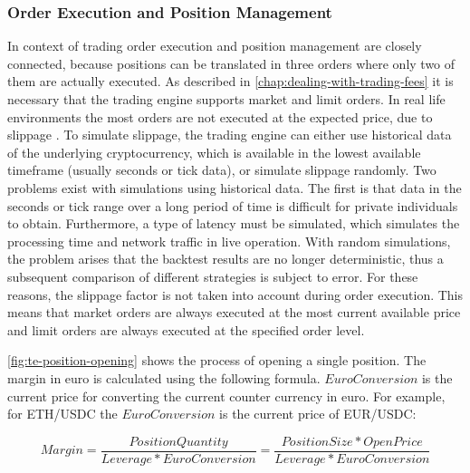 \subsubsection{Order Execution and Position Management}

In context of trading order execution and position management are closely connected, because positions can be translated in three orders where only two of them are actually executed.
As described in \autoref{chap:dealing-with-trading-fees} it is necessary that the trading engine supports market and limit orders.
In real life environments the most orders are not executed at the expected price, due to slippage \cite{ig-slippage}.
To simulate slippage, the trading engine can either use historical data of the underlying cryptocurrency, which is available in the lowest available timeframe (usually seconds or tick data), or simulate slippage randomly.
Two problems exist with simulations using historical data.
The first is that data in the seconds or tick range over a long period of time is difficult for private individuals to obtain.
Furthermore, a type of latency must be simulated, which simulates the processing time and network traffic in live operation.
With random simulations, the problem arises that the backtest results are no longer deterministic, thus a subsequent comparison of different strategies is subject to error.
For these reasons, the slippage factor is not taken into account during order execution.
This means that market orders are always executed at the most current available price and limit orders are always executed at the specified order level.


\autoref{fig:te-position-opening} shows the process of opening a single position.
The margin in euro is calculated using the following formula.
$EuroConversion$ is the current price for converting the current counter currency in euro.
For example, for ETH/USDC the $EuroConversion$ is the current price of EUR/USDC:

\begin{equation}
    Margin = \frac{PositionQuantity}{Leverage * EuroConversion} = \frac{PositionSize * OpenPrice}{Leverage * EuroConversion}
\end{equation}

